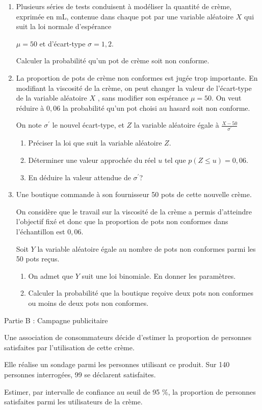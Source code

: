 \begin{enumerate}
     \item
     Plusieurs séries de tests conduisent à modéliser la quantité de crème, exprimée en mL, contenue dans chaque pot par une variable aléatoire $X$ qui suit la loi normale d'espérance
     \par
     $\mu  = 50$ et d'écart-type $\sigma  = 1, 2$.
     \par
     Calculer la probabilité qu'un pot de crème soit non conforme.
     \item
     La proportion de pots de crème non conformes est jugée trop importante. En modifiant la viscosité de la crème, on peut changer la valeur de l'écart-type de la variable aléatoire $X$ , sans modifier son espérance $\mu  = 50$. On veut réduire à $0, 06$ la probabilité qu'un pot choisi au hasard soit non conforme.
     \par
     On note $\sigma ^{\prime}$ le nouvel écart-type, et $Z$ la variable aléatoire égale à $\frac{X-50}{\sigma ^{\prime}}$
     \begin{enumerate}[label=\alph*.]
          \item
          Préciser la loi que suit la variable aléatoire $Z$.
          \item
          Déterminer une valeur approchée du réel $u$ tel que $p\left(Z \leqslant  u\right) = 0, 06$.
          \item
          En déduire la valeur attendue de $\sigma ^{\prime}$?
     \end{enumerate}
     \item
     Une boutique commande à son fournisseur 50 pots de cette nouvelle crème.
     \par
     On considère que le travail sur la viscosité de la crème a permis d'atteindre l'objectif fixé et donc que la proportion de pots non conformes dans l'échantillon est $0,06$.
     \par
     Soit $Y$ la variable aléatoire égale au nombre de pots non conformes parmi les 50 pots reçus.
     \begin{enumerate}[label=\alph*.]
          \item
          On admet que $Y$ suit une loi binomiale. En donner les paramètres.
          \item
          Calculer la probabilité que la boutique reçoive deux pots non conformes ou moins de deux pots non conformes.
     \end{enumerate}
\end{enumerate}
\begin{h3}Partie B : Campagne publicitaire\end{h3}
Une association de consommateurs décide d'estimer la proportion de personnes satisfaites par l'utilisation de cette crème.
\par
Elle réalise un sondage parmi les personnes utilisant ce produit. Sur 140 personnes interrogées, 99 se déclarent satisfaites.
\par
Estimer, par intervalle de confiance au seuil de 95 \%, la proportion de personnes satisfaites parmi les utilisateurs de la crème.
